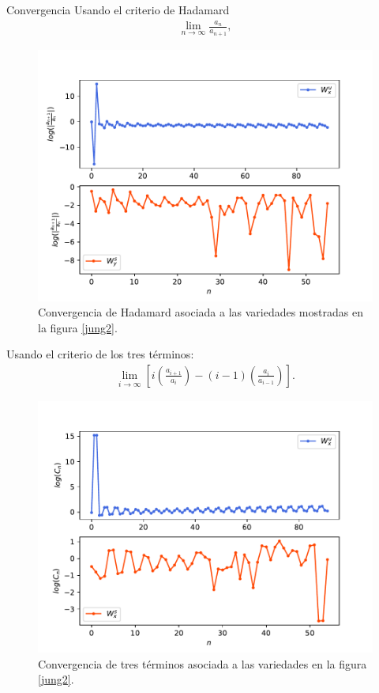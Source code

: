 \documentclass[11pt]{beamer}
\theoremstyle{definition}
\begin{document}
\begin{frame}{Convergencia}
Usando el criterio de Hadamard
\begin{eqnarray}
\lim_{n\rightarrow\infty}\frac{a_{n}}{a_{n+1}},\label{hadamard}
\end{eqnarray} 
\begin{figure}
	\centering
	\includegraphics[scale=0.4]{convergenciaJungH57}
	\caption{Convergencia de Hadamard asociada a las variedades mostradas en la figura \ref{jung2}.}
	\label{convergenciaJH}
\end{figure}


\end{frame}
\begin{frame}
Usando el criterio de los tres t\'erminos:
\begin{eqnarray}
\lim_{i\rightarrow\infty} \left[ i\left(\frac{a_{i+1}}{a_{i}}\right)-(i-1)\left(\frac{a_{i}}{a_{i-1}}\right) \right].
\label{tres terminos}
\end{eqnarray}
\begin{figure}
	\centering
	\includegraphics[scale=0.4]{convergenciaJungT57}
	\caption{Convergencia de tres términos asociada a las variedades en la figura \ref{jung2}.}
	\label{convergenciaJ3}
\end{figure}
\end{frame}
\end{document}
